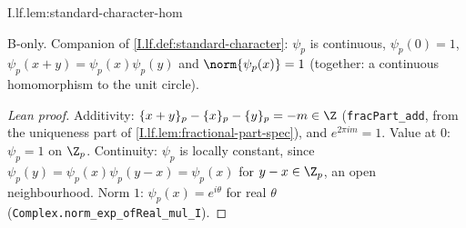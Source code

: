 \begin{lemma}
\bonly
{}
\end{lemma}
\begin{tfformal}{I.lf.lem:standard-character-hom}
\begin{tffidelity}
B-only. Companion of \cref{I.lf.def:standard-character}: $\psi_p$ is continuous, $\psi_p(0)=1$, $\psi_p(x+y)=\psi_p(x)\psi_p(y)$ and $\norm{\psi_p(x)}=1$ (together: a continuous homomorphism to the unit circle).
\end{tffidelity}
\end{tfformal}
\begin{proof}[Lean proof]
Additivity: $\{x+y\}_p-\{x\}_p-\{y\}_p=-m\in\Z$ (\texttt{fracPart\_add}, from the uniqueness part of \cref{I.lf.lem:fractional-part-spec}), and $e^{2\pi i m}=1$. Value at $0$: $\psi_p=1$ on $\Z_p$. Continuity: $\psi_p$ is locally constant, since $\psi_p(y)=\psi_p(x)\psi_p(y-x)=\psi_p(x)$ for $y-x\in\Z_p$, an open neighbourhood. Norm $1$: $\psi_p(x)=e^{i\theta}$ for real $\theta$ (\texttt{Complex.norm\_exp\_ofReal\_mul\_I}).
\end{proof}

\begin{tfoutline}
\end{tfoutline}

